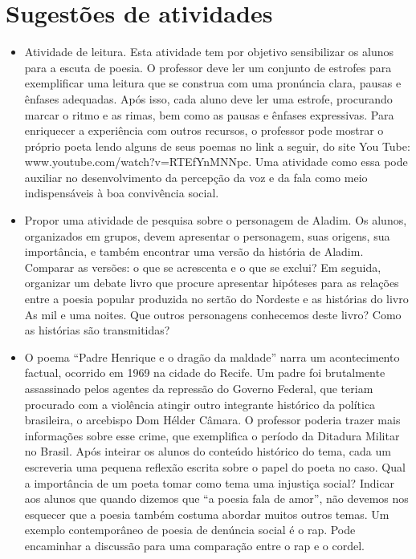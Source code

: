\documentclass[11pt]{hedrabook_ficha}
\begin{document}
\section{Sugestões de atividades}
\begin{itemize}


\item Atividade de leitura. Esta atividade tem por objetivo sensibilizar os
  alunos para a escuta de poesia. O professor deve ler um conjunto de estrofes
  para exemplificar uma leitura que se construa com uma pronúncia clara, pausas
  e ênfases adequadas. Após isso, cada aluno deve ler uma estrofe, procurando
  marcar o ritmo e as rimas, bem como as pausas e ênfases expressivas. Para
  enriquecer a experiência com outros recursos, o professor pode mostrar o
  próprio poeta lendo alguns de seus poemas no link a seguir, do site You Tube:
  www.youtube.com/watch?v=RTEfYnMNNpc. Uma atividade como essa pode
  auxiliar no desenvolvimento da percepção da voz e da fala como meio
  indispensáveis à boa convivência social.

\item Propor uma atividade de pesquisa sobre o personagem de Aladim. Os alunos,
  organizados em grupos, devem apresentar o personagem, suas origens, sua
  importância, e também encontrar uma versão da história de Aladim. Comparar as
  versões: o que se acrescenta e o que se exclui? Em seguida, organizar um
  debate livro que procure apresentar hipóteses para as relações entre a poesia
  popular produzida no sertão do Nordeste e as histórias do livro As mil e uma
  noites. Que outros personagens conhecemos deste livro? Como as histórias são
  transmitidas?

\item O poema “Padre Henrique e o dragão da maldade” narra um acontecimento
  factual, ocorrido em 1969 na cidade do Recife. Um padre foi brutalmente
  assassinado pelos agentes da repressão do Governo Federal, que teriam
  procurado com a violência atingir outro integrante histórico da política
  brasileira, o arcebispo Dom Hélder Câmara. O professor poderia trazer mais
  informações sobre esse crime, que exemplifica o período da Ditadura Militar
  no Brasil. Após inteirar os alunos do conteúdo histórico do tema, cada um
  escreveria uma pequena reflexão escrita sobre o papel do poeta no caso. Qual
  a importância de um poeta tomar como tema uma injustiça social? Indicar aos
  alunos que quando dizemos que “a poesia fala de amor”, não devemos nos
  esquecer que a poesia também costuma abordar muitos outros temas. Um exemplo
  contemporâneo de poesia de denúncia social é o rap. Pode encaminhar a
  discussão para uma comparação entre o rap e o cordel.


\end{itemize}
\end{document}
